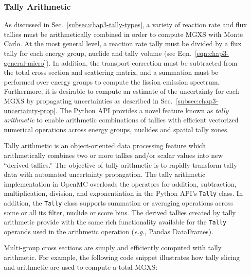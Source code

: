 \subsubsection{Tally Arithmetic}
\label{sec:chap3-tally-arithmetic}

As discussed in Sec.~\ref{subsec:chap3-tally-types}, a variety of reaction rate and flux tallies must be arithmetically combined in order to compute \ac{MGXS} with Monte Carlo. At the most general level, a reaction rate tally must be divided by a flux tally for each energy group, nuclide and tally volume (see Eqn.~\ref{eqn:chap3-general-micro}). In addition, the transport correction must be subtracted from the total cross section and scattering matrix, and a summation must be performed over energy groups to compute the fission emission spectrum. Furthermore, it is desirable to compute an estimate of the uncertainty for each \ac{MGXS} by propagating uncertainties as described in Sec.~\ref{subsec:chap3-uncertainty-prop}. The Python \ac{API} provides a novel feature known as \textit{tally arithmetic} to enable arithmetic combinations of tallies with efficient vectorized numerical operations across energy groups, nuclides and spatial tally zones.

Tally arithmetic is an object-oriented data processing feature which arithmetically combines two or more tallies and/or scalar values into new ``derived tallies.'' The objective of tally arithmetic is to rapidly transform tally data with automated uncertainty propagation. The tally arithmetic implementation in OpenMC overloads the operators for addition, subtraction, multiplication, division, and exponentiation in the Python \ac{API}'s \texttt{Tally} class. In addition, the \texttt{Tally} class supports summation or averaging operations across some or all its filter, nuclide or score bins.  The derived tallies created by tally arithmetic provide with the same rich functionality available for the \texttt{Tally} operands used in the arithmetic operation (\textit{e.g.}, Pandas DataFrames).

Multi-group cross sections are simply and efficiently computed with tally arithmetic. For example, the following code snippet illustrates how tally slicing and arithmetic are used to compute a total \ac{MGXS}:



